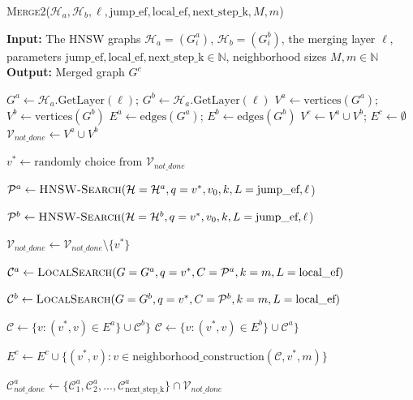 \documentclass{article}
\begin{document}
\begin{algorithm}
    \caption{\textsc{Merge2}($\mathcal{H}_a, \mathcal{H}_b, \ell, \text{jump\_ef}, \text{local\_ef}, \text{next\_step\_k}, M, m$)}\label{alg:merge2}
    \textbf{Input:} The HNSW graphs $\mathcal{H}_a = (G^a_i)$, $\mathcal{H}_b = (G^b_i)$, the merging layer $\ell$, parameters $\text{jump\_ef}, \text{local\_ef}, \text{next\_step\_k} \in \mathbb{N}$, neighborhood sizes $M, m \in \mathbb{N}$ \\
    \textbf{Output:} Merged graph $G^c$ 
\begin{algorithmic}[1]

\State $G^a \gets \mathcal{H}_a\text{.GetLayer}(\ell) $; $G^b \gets\mathcal{H}_a\text{.GetLayer}(\ell)$ 
\State $V^a \gets \text{vertices}(G^a)$; $V^b \gets \text{vertices}(G^b)$
\State $E^a \gets \text{edges}(G^a)$; $E^b \gets \text{edges}(G^b)$
\State $V^c \gets V^a \cup V^b$; $E^c \gets \emptyset$
\State $\mathcal{V}_{not\_done} \gets V^a \cup V^b$

    \State $v^* \gets \text{randomly choice from } \mathcal{V}_{not\_done}$

    \State $\mathcal{P}^a  \gets \textsc{HNSW-Search}(\mathcal{H}=\mathcal{H}^a, q=v^*, v_0, k, L=\text{jump\_ef}, \ell $)

    \State $\mathcal{P}^b \gets \textsc{HNSW-Search}(\mathcal{H}=\mathcal{H}^b, q=v^*, v_0, k, L=\text{jump\_ef}, \ell $)
    
    
        \State $\mathcal{V}_{not\_done} \gets \mathcal{V}_{not\_done} \setminus \{v^*\}$
        

        \State $ \mathcal{C}^a  \gets \textsc{LocalSearch}(G=G^a, q=v^*, C=\mathcal{P}^a  , k=m, L=\text{local\_ef})$
        
        \State $\mathcal{C}^b \gets \textsc{LocalSearch}(G=G^b, q=v^*, C=\mathcal{P}^b , k=m, L=\text{local\_ef})$
        
            \State $\mathcal{C}\gets  \{v : (v^*, v) \in E^a \} \cup  \mathcal{C}^b\}$
        \Else
            \State $\mathcal{C} \gets  \{v : (v^*, v) \in E^b \} \cup  \mathcal{C}^a\}$
        \EndIf
        
        \State $E^c \gets E^c \cup \{ (v^*, v) : v \in \text{neighborhood\_construction}(\mathcal{C}, v^*, m) \}$
        
        \State $\mathcal{C}^a_{not\_done} \gets \{\mathcal{C}^a_1, \mathcal{C}^a_2, ..., \mathcal{C}^a_{ \text{next\_step\_k} } \} \cap \mathcal{V}_{not\_done}$


\end{algorithmic}
\end{algorithm}
\end{document}
